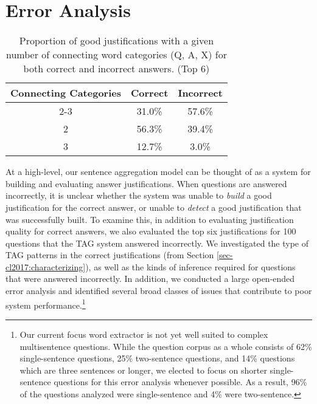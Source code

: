 \section{Error Analysis}
\label{sec-cl2017:erroranalysis}

%
%
\begin{table}[t]
\small
\label{tab:errorconnectiontypes}
\begin{center}
\begin{tabular}{ccc}
\hline
\multicolumn{1}{l}{Connecting Categories} & \multicolumn{1}{c}{Correct} & \multicolumn{1}{c}{Incorrect}  \\
\cline{2-3}
\hline
1				&	31.0\%		& 57.6\%	\\
2				&	56.3\%		& 39.4\%	\\
3				&	12.7\%		& 3.0\%	\\
\end{tabular}
\caption{{ Proportion of good justifications with a given number of connecting word categories (Q, A, X) for both correct and incorrect answers. (Top 6) }}
\end{center}
\end{table}

At a high-level, our sentence aggregation model can be thought of as a system for building and evaluating answer justifications.  When questions are answered incorrectly, it is unclear whether the system was unable to \emph{build} a good justification for the correct answer, or unable to \emph{detect} a good justification that was successfully built.  To examine this, in addition to evaluating justification quality for correct answers, we also evaluated the top six justifications for 100 questions that the TAG system answered incorrectly.  We investigated the type of TAG patterns in the correct justifications  (from Section \ref{sec-cl2017:characterizing}), as well as the kinds of inference required for questions that were answered incorrectly.  In addition, we conducted a large open-ended error analysis and identified several broad classes of issues that contribute to poor system performance.\footnote{Our current focus word extractor is not yet well suited to complex multisentence questions. While the question corpus as a whole consists of 62\% single-sentence questions, 25\% two-sentence questions, and 14\% questions which are three sentences or longer, we elected to focus on shorter single-sentence questions for this error analysis whenever possible.  As a result, 96\% of the questions analyzed were single-sentence and 4\% were two-sentence.}

